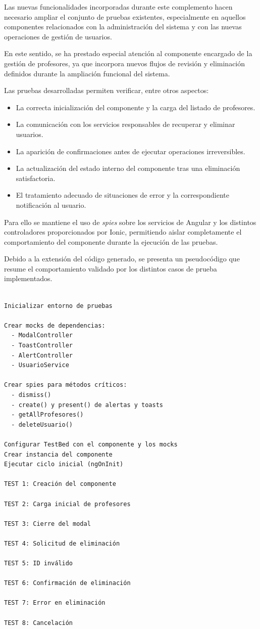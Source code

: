 Las nuevas funcionalidades incorporadas durante este complemento hacen necesario ampliar el conjunto de pruebas existentes, especialmente en aquellos componentes relacionados con la administración del sistema y con las nuevas operaciones de gestión de usuarios.

En este sentido, se ha prestado especial atención al componente encargado de la gestión de profesores, ya que incorpora nuevos flujos de revisión y eliminación definidos durante la ampliación funcional del sistema.

Las pruebas desarrolladas permiten verificar, entre otros aspectos:

\begin{itemize}
    \item La correcta inicialización del componente y la carga del listado de profesores.
    \item La comunicación con los servicios responsables de recuperar y eliminar usuarios.
    \item La aparición de confirmaciones antes de ejecutar operaciones irreversibles.
    \item La actualización del estado interno del componente tras una eliminación satisfactoria.
    \item El tratamiento adecuado de situaciones de error y la correspondiente notificación al usuario.
\end{itemize}

Para ello se mantiene el uso de \textit{spies} sobre los servicios de Angular y los distintos controladores proporcionados por Ionic, permitiendo aislar completamente el comportamiento del componente durante la ejecución de las pruebas.

Debido a la extensión del código generado, se presenta un pseudocódigo que resume el comportamiento validado por los distintos casos de prueba implementados.

\begin{Verbatim}[frame=single, fontsize=\small, xleftmargin=10pt, xrightmargin=10pt]

Inicializar entorno de pruebas

Crear mocks de dependencias:
  - ModalController
  - ToastController
  - AlertController
  - UsuarioService

Crear spies para métodos críticos:
  - dismiss()
  - create() y present() de alertas y toasts
  - getAllProfesores()
  - deleteUsuario()

Configurar TestBed con el componente y los mocks
Crear instancia del componente
Ejecutar ciclo inicial (ngOnInit)

TEST 1: Creación del componente

TEST 2: Carga inicial de profesores

TEST 3: Cierre del modal

TEST 4: Solicitud de eliminación

TEST 5: ID inválido

TEST 6: Confirmación de eliminación

TEST 7: Error en eliminación

TEST 8: Cancelación

\end{Verbatim}

